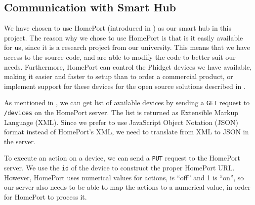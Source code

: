 \subsection{Communication with Smart Hub}\label{sec:designsmarthub}
We have chosen to use HomePort (introduced in ) as our smart hub in this project.
The reason why we chose to use HomePort is that is it easily available for us, 
since it is a research project from our university. 
This means that we have access to the source code, 
and are able to modify the code to better suit our needs.
Furthermore, HomePort can control the Phidget devices we have available, 
making it easier and faster to setup than to order a commercial product, 
or implement support for these devices for the open source solutions described in . 

As mentioned in , we can get list of available devices by sending a \texttt{GET} request to \texttt{/devices} on the HomePort server. 
The list is returned as Extensible Markup Language (XML). 
Since we prefer to use JavaScript Object Notation (JSON) format instead of HomePort's XML, 
we need to translate from XML to JSON in the server. 

To execute an action on a device, we can send a \texttt{PUT} request to the HomePort server. 
We use the \texttt{id} of the device to construct the proper HomePort URL. 
However, HomePort uses numerical values for actions,  is ``off'' and 1 is ``on'', 
so our server also needs to be able to map the actions to a numerical value, 
in order for HomePort to process it. 
